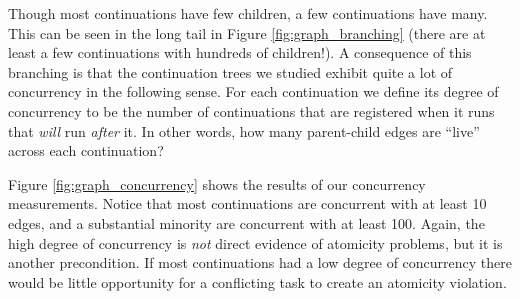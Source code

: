 \documentclass[acmsmall,anonymous,review]{acmart}\settopmatter{printfolios=true,printccs=false,printacmref=false}
\begin{document}
Though most continuations have few children, a few continuations have many.
This can be seen in the long tail in Figure \ref{fig:graph_branching} (there are at least a few continuations with hundreds of children!).
A consequence of this branching is that the continuation trees we studied exhibit quite a lot of concurrency in the following sense.
For each continuation we define its degree of concurrency to be the number of continuations that are registered when it runs that \emph{will} run \emph{after} it.
In other words, how many parent-child edges are ``live'' across each continuation?

Figure \ref{fig:graph_concurrency} shows the results of our concurrency measurements.
Notice that most continuations are concurrent with at least 10 edges, and a substantial minority are concurrent with at least 100.
Again, the high degree of concurrency is \emph{not} direct evidence of atomicity problems, but it is another precondition.
If most continuations had a low degree of concurrency there would be little opportunity for a conflicting task to create an atomicity violation.
\end{document}
